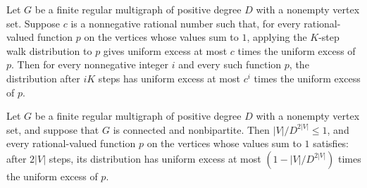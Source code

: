 \begin{theorem}
\label{Randomized.RegularMultigraph.uniformExcess_walkDist_mul_le}
\leanok
{}
Let $G$ be a finite regular multigraph of positive degree $D$ with a nonempty vertex
set. Suppose $c$ is a nonnegative rational number such that, for every rational-valued
function $p$ on the vertices whose values sum to $1$, applying the $K$-step walk
distribution to $p$ gives uniform excess at most $c$ times the uniform excess of $p$.
Then for every nonnegative integer $i$ and every such function $p$, the distribution
after $iK$ steps has uniform excess at most $c^i$ times the uniform excess of $p$.
\end{theorem}

\begin{theorem}
\label{Randomized.RegularMultigraph.uniformExcess_walkDist_two_mul_le_aux}
\leanok
{}
Let $G$ be a finite regular multigraph of positive degree $D$ with a nonempty vertex
set, and suppose that $G$ is connected and nonbipartite. Then $|V|/D^{2|V|}\le 1$, and
every rational-valued function $p$ on the vertices whose values sum to $1$ satisfies:
after $2|V|$ steps, its distribution has uniform excess at most
$\left(1-|V|/D^{2|V|}\right)$ times the uniform excess of $p$.
\end{theorem}

